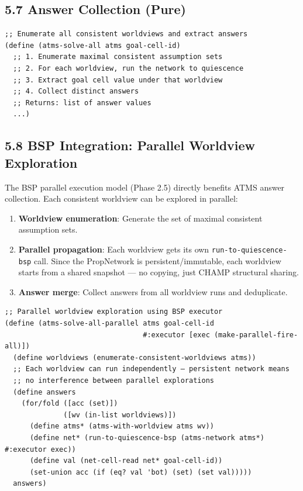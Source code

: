 \documentclass[11pt]{article}
\begin{document}
\subsection{5.7 Answer Collection (Pure)}
\label{sec:orgbfd8f67}

\begin{verbatim}
;; Enumerate all consistent worldviews and extract answers
(define (atms-solve-all atms goal-cell-id)
  ;; 1. Enumerate maximal consistent assumption sets
  ;; 2. For each worldview, run the network to quiescence
  ;; 3. Extract goal cell value under that worldview
  ;; 4. Collect distinct answers
  ;; Returns: list of answer values
  ...)
\end{verbatim}
\subsection{5.8 BSP Integration: Parallel Worldview Exploration}
\label{sec:orgbc7a953}

The BSP parallel execution model (Phase 2.5) directly benefits ATMS answer
collection. Each consistent worldview can be explored in parallel:

\begin{enumerate}
\item \textbf{Worldview enumeration}: Generate the set of maximal consistent assumption sets.
\item \textbf{Parallel propagation}: Each worldview gets its own \texttt{run-to-quiescence-bsp}
call. Since the PropNetwork is persistent/immutable, each worldview starts
from a shared snapshot — no copying, just CHAMP structural sharing.
\item \textbf{Answer merge}: Collect answers from all worldview runs and deduplicate.
\end{enumerate}

\begin{verbatim}
;; Parallel worldview exploration using BSP executor
(define (atms-solve-all-parallel atms goal-cell-id
                                 #:executor [exec (make-parallel-fire-all)])
  (define worldviews (enumerate-consistent-worldviews atms))
  ;; Each worldview can run independently — persistent network means
  ;; no interference between parallel explorations
  (define answers
    (for/fold ([acc (set)])
              ([wv (in-list worldviews)])
      (define atms* (atms-with-worldview atms wv))
      (define net* (run-to-quiescence-bsp (atms-network atms*) #:executor exec))
      (define val (net-cell-read net* goal-cell-id))
      (set-union acc (if (eq? val 'bot) (set) (set val)))))
  answers)
\end{verbatim}
\end{document}

